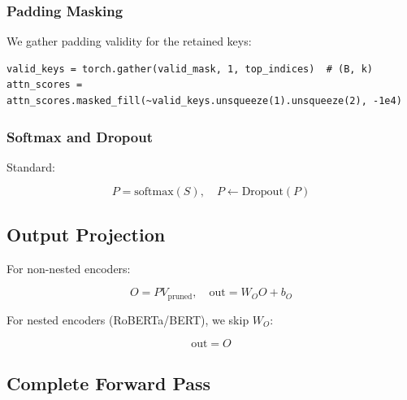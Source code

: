\subsubsection{Padding Masking}

We gather padding validity for the retained keys:

\begin{lstlisting}
valid_keys = torch.gather(valid_mask, 1, top_indices)  # (B, k)
attn_scores = attn_scores.masked_fill(~valid_keys.unsqueeze(1).unsqueeze(2), -1e4)
\end{lstlisting}

\subsubsection{Softmax and Dropout}

Standard:

\[
P = \text{softmax}(S), \quad P \leftarrow \text{Dropout}(P)
\tag{4.6}
\]

\subsection{Output Projection}

For non-nested encoders:

\[
O = P V_\text{pruned}, \quad \text{out} = W_O O + b_O
\tag{4.7}
\]

For nested encoders (RoBERTa/BERT), we skip $W_O$:

\[
\text{out} = O
\tag{4.8}
\]

\subsection{Complete Forward Pass}

